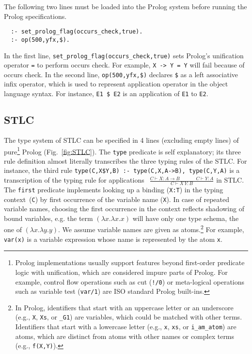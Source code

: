 \documentclass[runningheads,a4paper]{llncs}
\begin{document}
The following two lines must be loaded into the Prolog system
before running the Prolog specifications.
\begin{verbatim}
  :- set_prolog_flag(occurs_check,true).
  :- op(500,yfx,$).
\end{verbatim} \noindent
In the first line, \verb|set_prolog_flag(occurs_check,true)|
sets Prolog's unification operator \verb|=| to perform occurs check.
For example, \verb|X -> Y = Y| will fail because of occurs check.
In the second line, \verb|op(500,yfx,$)| declares \verb|$|
as a left associative infix operator, which is used to represent
application operator in the object language syntax. For instance,
\verb|E1 $ E2| is an application of \verb|E1| to
\verb|E2|.

\subsection{STLC}\label{ssec:STLC}
The type system of STLC can be specified in 4 lines
(excluding empty lines) of pure\footnote{
    Prolog implementations usually support features beyond
    first-order predicate logic with unification, which are
    considered impure parts of Prolog. For example,
    control flow operations such as cut (\texttt{!/0}) or
    meta-logical operations such as variable test (\texttt{var/1}) are
    ISO standard Prolog built-ins.} Prolog (Fig.~\ref{fig:STLC}).
The \verb|type| predicate is self explanatory; its three rule
definition almost literally transcribes the three typing rules of
the STLC. For instance, the third rule
\texttt{\small type(C,X\$Y,B) :- type(C,X,A->B), type(C,Y,A)}
is a transcription of the typing rule for applications
$~~\frac{C\vdash X:A\to B\qquad~~\quad C\vdash Y:A}{C\vdash X\,Y:B}$ in STLC.
The \verb|first| predicate implements looking up a binding
(\verb|X:T|) in the typing context~(\verb|C|)
by first occurrence of the variable name (\verb|X|).
In case of repeated variable names, choosing the first occurrence in the context reflects shadowing of bound variables,
e.g. the term $(\lambda x. \lambda x. x)$ will have only one type schema, the one of $(\lambda x. \lambda y. y)$.
We assume variable names are given as atoms.\footnote{
    In Prolog, identifiers that start with an uppercase letter or
    an underscore (e.g., \texttt{X}, \texttt{Xs}, or \texttt{\_G1}) are
    variables, which could be matched with other terms. Identifiers that
    start with a lowercase letter (e.g., \texttt{x}, \texttt{xs}, or
    \texttt{i\_am\_atom}) are atoms, which are distinct from atoms with
    other names or complex terms
    (e.g., \texttt{f(X,Y)}).} For example, \verb|var(x)| is
a variable expression whose name is represented by the atom \verb|x|.
\end{document}
